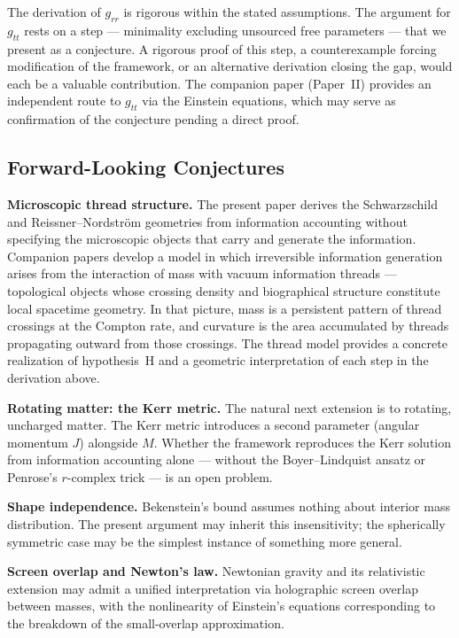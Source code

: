 \documentclass[12pt]{article}
\begin{document}
The derivation of $g_{rr}$ is rigorous within the stated assumptions.
The argument for $g_{tt}$ rests on a step --- minimality excluding
unsourced free parameters --- that we present as a conjecture.
A rigorous proof of this step, a counterexample forcing modification
of the framework, or an alternative derivation closing the gap, would
each be a valuable contribution.
The companion paper (Paper~II) provides an independent route to $g_{tt}$
via the Einstein equations, which may serve as confirmation of the
conjecture pending a direct proof.

\subsection{Forward-Looking Conjectures}

\noindent\textbf{Microscopic thread structure.}
The present paper derives the Schwarzschild and Reissner--Nordstr\"om
geometries from information accounting without specifying the
microscopic objects that carry and generate the information.
Companion papers develop a model in which irreversible information
generation arises from the interaction of mass with vacuum information
threads --- topological objects whose crossing density and biographical
structure constitute local spacetime geometry.
In that picture, mass is a persistent pattern of thread crossings at
the Compton rate, and curvature is the area accumulated by threads
propagating outward from those crossings.
The thread model provides a concrete realization of hypothesis~H and
a geometric interpretation of each step in the derivation above.

\medskip
\noindent\textbf{Rotating matter: the Kerr metric.}
The natural next extension is to rotating, uncharged matter.
The Kerr metric introduces a second parameter (angular momentum $J$)
alongside $M$.
Whether the framework reproduces the Kerr solution from information
accounting alone --- without the Boyer--Lindquist ansatz or Penrose's
$r$-complex trick --- is an open problem.

\medskip
\noindent\textbf{Shape independence.}
Bekenstein's bound assumes nothing about interior mass distribution.
The present argument may inherit this insensitivity; the spherically
symmetric case may be the simplest instance of something more general.

\medskip
\noindent\textbf{Screen overlap and Newton's law.}
Newtonian gravity and its relativistic extension may admit a unified
interpretation via holographic screen overlap between masses, with the
nonlinearity of Einstein's equations corresponding to the breakdown of
the small-overlap approximation.
\end{document}
